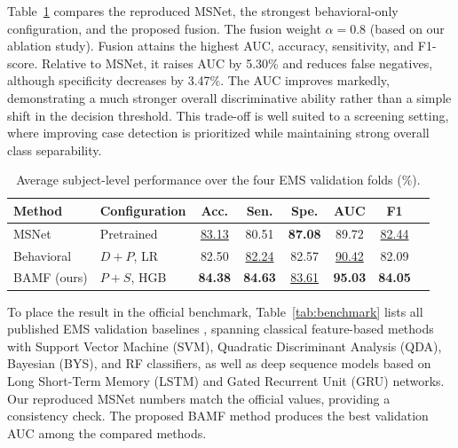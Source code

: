 \documentclass[conference,a4paper]{IEEEtran}
\begin{document}
Table~\ref{tab:main_results} compares the reproduced MSNet, the strongest behavioral-only configuration, and the proposed fusion. The fusion weight $\alpha = 0.8$ (based on our ablation study). Fusion attains the highest AUC, accuracy, sensitivity, and F1-score. Relative to MSNet, it raises AUC by 5.30\% and reduces false negatives, although specificity decreases by 3.47\%. The AUC improves markedly, demonstrating a much stronger overall discriminative ability rather than a simple shift in the decision threshold. This trade-off is well suited to a screening setting, where improving case detection is prioritized while maintaining strong overall class separability.



\begin{table}[t]
\caption{Average subject-level performance over the four EMS validation folds (\%).}
\label{tab:main_results}
\centering
\small
\setlength{\tabcolsep}{5pt}
\begin{tabular}{llcccccc}
\toprule
Method & Configuration & Acc. & Sen. & Spe. & AUC &  F1 \\
\midrule
MSNet & Pretrained & \underline{83.13} & 80.51 & \textbf{87.08} & 89.72 & \underline{82.44} \\
Behavioral & $D+P$, LR & 82.50 & \underline{82.24} & 82.57 & \underline{90.42} &  82.09 \\
BAMF (ours) & $P+S$, HGB & \textbf{84.38} & \textbf{84.63} & \underline{83.61} & \textbf{95.03} &  \textbf{84.05} \\
\bottomrule
\end{tabular}
\end{table}

To place the result in the official benchmark, Table~\ref{tab:benchmark} lists all published EMS validation baselines \cite{song2024ems}, spanning classical feature-based methods with Support Vector Machine (SVM), Quadratic Discriminant Analysis (QDA), Bayesian (BYS), and RF classifiers, as well as deep sequence models based on Long Short-Term Memory (LSTM) and Gated Recurrent Unit (GRU) networks. Our reproduced MSNet numbers match the official values, providing a consistency check. The proposed BAMF method produces the best validation AUC among the compared methods. 
\end{document}
